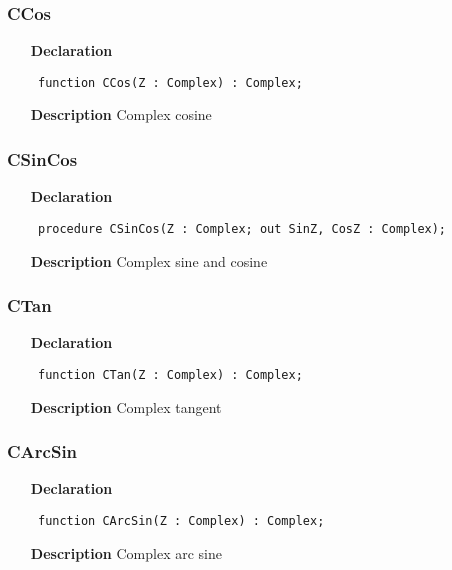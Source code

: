 \documentclass[12pt,a4paper,oneside]{report}
\newcommand{\declarationitem}[1]{\textbf{#1}}
\newcommand{\descriptiontitle}[1]{\textbf{#1}}
\newcommand{\code}[1]{\texttt{#1}}
\begin{document}
\subsubsection{CCos}
\label{ucomplex-CCos}
\begin{itemize}\item[\declarationitem{Declaration}\hfill]
\begin{flushleft}
\code{
function CCos(Z : Complex) : Complex;}

\end{flushleft}

\par
\item[\descriptiontitle{Description}]
Complex cosine

\end{itemize}
\subsubsection{CSinCos}
\label{ucomplex-CSinCos}
\begin{itemize}\item[\declarationitem{Declaration}\hfill]
\begin{flushleft}
\code{
procedure CSinCos(Z : Complex; out SinZ, CosZ : Complex);}

\end{flushleft}

\par
\item[\descriptiontitle{Description}]
Complex sine and cosine

\end{itemize}
\subsubsection{CTan}
\label{ucomplex-CTan}
\begin{itemize}\item[\declarationitem{Declaration}\hfill]
\begin{flushleft}
\code{
function CTan(Z : Complex) : Complex;}

\end{flushleft}

\par
\item[\descriptiontitle{Description}]
Complex tangent

\end{itemize}
\subsubsection{CArcSin}
\label{ucomplex-CArcSin}
\begin{itemize}\item[\declarationitem{Declaration}\hfill]
\begin{flushleft}
\code{
function CArcSin(Z : Complex) : Complex;}

\end{flushleft}

\par
\item[\descriptiontitle{Description}]
Complex arc sine

\end{itemize}
\end{document}
